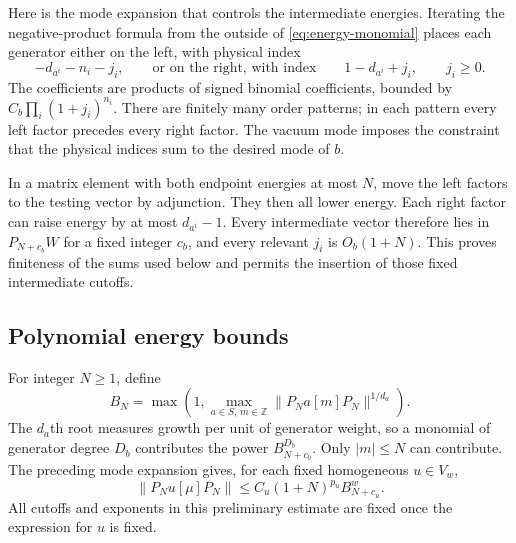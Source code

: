 Here is the mode expansion that controls the intermediate energies.
Iterating the negative-product formula from the outside of
\eqref{eq:energy-monomial} places each generator either on the left,
with physical index
\begin{equation}\label{eq:energy-left-right-indices}
 -d_{a^i}-n_i-j_i,
 \qquad\text{or on the right, with index}\qquad
 1-d_{a^i}+j_i,\qquad j_i\geq0.
\end{equation}
The coefficients are products of signed binomial coefficients, bounded
by $C_b\prod_i(1+j_i)^{n_i}$.  There are finitely many order patterns;
in each pattern every left factor precedes every right factor.  The
vacuum mode imposes the constraint that the physical indices sum to the
desired mode of $b$.

In a matrix element with both endpoint energies at most $N$, move the
left factors to the testing vector by adjunction.  They then all lower
energy.  Each right factor can raise energy by at most $d_{a^i}-1$.
Every intermediate vector therefore lies in $P_{N+c_b}W$ for a fixed
integer $c_b$, and every relevant $j_i$ is $O_b(1+N)$.  This proves
finiteness of the sums used below and permits the insertion of those
fixed intermediate cutoffs.

\subsection{Polynomial energy bounds}

For integer $N\geq1$, define
\[
 B_N=\max\left(1,
       \max_{a\in S,\,m\in\mathbb Z}
          \|P_Na[m]P_N\|^{1/d_a}\right).
\]
The $d_a$th root measures growth per unit of generator weight, so a
monomial of generator degree $D_b$ contributes the power
$B_{N+c_b}^{D_b}$.
Only $|m|\leq N$ can contribute.  The preceding mode expansion gives,
for each fixed homogeneous $u\in V_w$,
\begin{equation}\label{eq:rough-monomial-bound}
 \|P_Nu[\mu]P_N\|
 \leq C_u(1+N)^{p_u}B_{N+c_u}^{w}.
\end{equation}
All cutoffs and exponents in this preliminary estimate are fixed once
the expression for $u$ is fixed.

